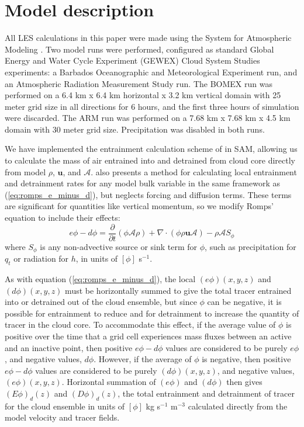 \documentclass[12pt]{article}
\begin{document}

\section{Model description}

All LES calculations in this paper were made using the System for Atmospheric 
Modeling \citep[SAM;][]{Khairoutdinov2003}.  Two model runs were performed, 
configured as standard Global Energy and Water Cycle Experiment (GEWEX) 
Cloud System Studies \citep[GCSS;][]{Randall2003} experiments: a Barbados 
Oceanographic and Meteorological Experiment \citep[BOMEX;][]{Siebesma2003} run,
and an Atmospheric Radiation Measurement Study \citep[ARM;][]{Brown2002} run. 
The BOMEX run was performed on a 6.4 km x 6.4 km horizontal x 3.2 km vertical 
domain with 25 meter grid size in all directions for 6 hours, and the first 
three hours of simulation were discarded. The ARM run was performed on a 
7.68 km x 7.68 km x 4.5 km domain with 30 meter grid size.  Precipitation was 
disabled in both runs.

We have implemented the entrainment calculation scheme of \cite{Romps2010} in 
SAM, allowing us to calculate the mass of air entrained into and detrained from
cloud core directly from model $\rho$, $\mathbf{u}$, and $\mathcal{A}$.  
\citet[eq. 4]{Romps2010} also presents a method for calculating local 
entrainment and detrainment rates for any model bulk variable in the same
framework as (\ref{eq:romps_e_minus_d}), but neglects forcing and diffusion
terms.  These terms are significant for quantities like vertical momentum, so 
we modify Romps' equation to include their effects:
\begin{equation}
  \label{eq:romps_ephi_minus_dphi}
  e\phi - d\phi = \frac{\partial}{\partial t}(\phi \mathcal{A} \rho) 
                + \nabla \cdot (\phi \rho \mathbf{u} \mathcal{A})
                - \rho \mathcal{A}S_\phi
\end{equation}
where $S_\phi$ is any non-advective source or sink term for $\phi$, such as 
precipitation for $q_t$ or radiation for $h$, in units of $[\phi]$ s$^{-1}$.  

As with equation (\ref{eq:romps_e_minus_d}), the local $(e\phi)(x,y,z)$
and $(d\phi)(x,y,z)$ must be horizontally summed to give the total
tracer entrained into or detrained out of the cloud ensemble, but
since $\phi$ can be negative, it is possible for entrainment to reduce
and for detrainment to increase the quantity of tracer in the cloud
core.  To accommodate this effect, if the average value of $\phi$ is
positive over the time that a grid cell experiences mass fluxes
between an active and an inactive point, then positive $e\phi-d\phi$
values are considered to be purely $e\phi$, and negative
values, $d\phi$.  However, if the average of $\phi$ is
negative, then positive $e\phi-d\phi$ values are considered to be
purely $(d\phi)(x,y,z)$, and negative values, $(e\phi)(x,y,z)$.
Horizontal summation of $(e\phi)$ and $(d\phi)$ then gives
$(E\phi)_d(z)$ and $(D\phi)_d(z)$, the total entrainment and
detrainment of tracer for the cloud ensemble in units of $[\phi]$ kg s$^{-1}$
m$^{-3}$ calculated directly from the model velocity and tracer fields.
\end{document}
